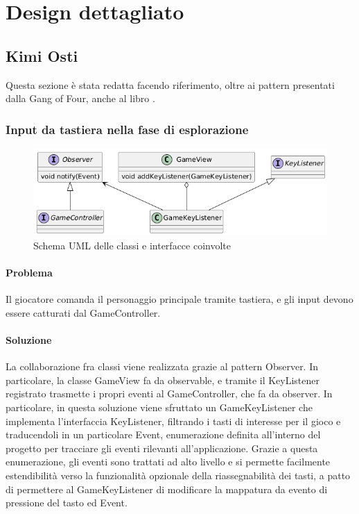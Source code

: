 \documentclass[a4paper,12pt]{report}
\begin{document}
\section{Design dettagliato}

\subsection{Kimi Osti}
Questa sezione è stata redatta facendo riferimento, oltre ai pattern presentati dalla Gang of Four, anche al libro \cite{nystrom2014}.

\subsubsection{Input da tastiera nella fase di esplorazione}
\begin{figure}[H]
	\centering
	\includegraphics[width=\textwidth]{img/observer-gameview.png}
	\caption{Schema UML delle classi e interfacce coinvolte}
	\label{img:observer-gameview}
\end{figure}
\paragraph{Problema} Il giocatore comanda il personaggio principale tramite tastiera, e gli input devono essere catturati dal GameController.
\paragraph{Soluzione} La collaborazione fra classi viene realizzata grazie al pattern Observer. In particolare, la classe GameView fa da observable, e tramite il KeyListener registrato trasmette i propri eventi al GameController, che fa da observer. In particolare, in questa soluzione viene sfruttato un GameKeyListener che implementa l'interfaccia KeyListener, filtrando i tasti di interesse per il gioco e traducendoli in un particolare Event, enumerazione definita all'interno del progetto per tracciare gli eventi rilevanti all'applicazione. Grazie a questa enumerazione, gli eventi sono trattati ad alto livello e si permette facilmente estendibilità verso la funzionalità opzionale della riassegnabilità dei tasti, a patto di permettere al GameKeyListener di modificare la mappatura da evento di pressione del tasto ed Event.
\end{document}
